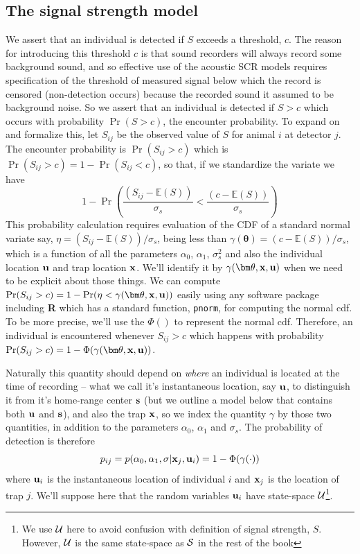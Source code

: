 \subsection{The signal strength model}

We assert that an individual is detected if $S$ exceeds a threshold,
$c$. The reason for introducing this threshold $c$ is that sound
recorders will always record some background sound, and so effective
use of the acoustic SCR models requires specification of the threshold
of measured signal below which the record is censored (non-detection
occurs) because the recorded sound it assumed to be background noise.
So we assert that an individual is detected if $S>c$ which occurs with
probability $\Pr(S > c)$, the encounter probability.  To expand on and
formalize this, let $S_{ij}$ be the observed value of $S$ for animal
$i$ at detector $j$.  The encounter probability is $\Pr(S_{ij}>c)$
which is $\Pr(S_{ij}>c) = 1- \Pr(S_{ij} < c)$, so that, if we
standardize the variate we have
\[
1-\Pr\left( \frac{ (S_{ij}- \mathbb{E}(S))}{\sigma_{s}}  <  \frac{
(c -  \mathbb{E}(S)) }{\sigma_{s}} \right)
\]
This probability calculation requires evaluation of the CDF of a
standard normal variate say, $\eta = (S_{ij}-
\mathbb{E}(S))/\sigma_{s}$, being less than $\gamma({\bm \theta}) = (c
- \mathbb{E}(S))/\sigma_{s}$, which is a function of all the
parameters $\alpha_{0}$, $\alpha_{1}$, $\sigma_{s}^{2}$ and also the
individual location ${\bf u}$ and trap location ${\bf x}$.  We'll
identify it by $\gamma({\bm \theta},{\bf x},{\bf u})$ when we need to
be explicit about those things.  We can compute $\Pr(S_{ij}>c) =
1-\Pr( \eta < \gamma({\bm \theta}, {\bf x},{\bf u}))$ easily using any
software package including {\bf R} which has a standard function,
\mbox{\tt pnorm}, for computing the normal cdf.  To be more precise,
we'll use the $\Phi()$ to represent the normal cdf. Therefore, an
individual is encountered whenever $S_{ij}>c$ which happens with
probability $\Pr(S_{ij}>c) = 1-\Phi( \gamma({\bm \theta}, {\bf x},{\bf
  u}) )$.

Naturally this quantity should depend on {\it where} an individual is
located at the time of recording -- what we call it's instantaneous
location, say ${\bf u}$, to distinguish it from it's home-range center
${\bf s}$ (but we outline a model below that contains both ${\bf u}$
and ${\bf s}$), and also the trap ${\bf x}$, so we index the quantity
$\gamma$ by those two quantities, in addition to the parameters
$\alpha_{0}$, $\alpha_{1}$ and $\sigma_{s}$.  The probability of
detection is therefore
\[
p_{ij} = p(\alpha_0, \alpha_1, \sigma | {\bf x}_{j}, {\bf u}_{i} ) = 1- \Phi( \gamma(\cdot))
\]
where
 ${\bf u}_{i}$ is the instantaneous location of individual $i$ and
${\bf x}_{j}$ is the location of trap $j$.  We'll suppose here that
the random variables ${\bf u}_{i}$ have state-space ${\cal
  U}$\footnote{We use ${\cal U}$ here to avoid confusion with
  definition of signal strength, $S$. However, ${\cal U}$ is the same
  state-space as ${\cal S}$ in the rest of the book}.

